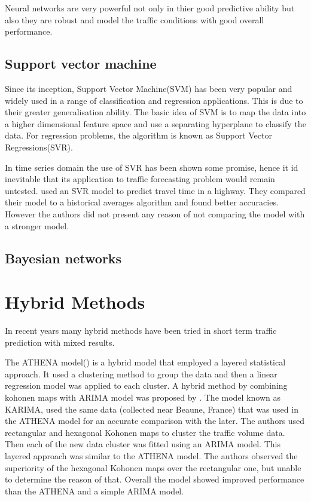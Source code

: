 Neural networks are very powerful not only in thier good predictive ability but also they are robust
and model the traffic conditions with good overall performance.

\subsection{Support vector machine}
Since its inception, Support Vector Machine(SVM) has been very popular and widely used in a range of
classification and regression applications. This is due to their greater generalisation ability.
The basic idea of SVM is to map the data into a higher dimensional feature space and use a separating
hyperplane to classify the data. For regression problems, the algorithm is known as Support Vector
Regressions(SVR).


In time series domain the use of SVR has been shown some promise, hence it id inevitable that its
application to traffic forecasting problem would remain untested. \citet{wu2004travel} used an SVR
model to predict travel time in a highway. They compared their model to a historical averages algorithm
and found better accuracies. However the authors did not present any reason of not comparing the model
with a stronger model.

\subsection{Bayesian networks}

\citet{castillo2008predicting}


\section{Hybrid Methods}
In recent years many hybrid methods have been tried in short term traffic prediction with mixed
results.

The ATHENA model(\citet{danech1991athena}) is a hybrid model that employed a layered statistical
approach. It used a clustering method to group the data and then a linear regression model was applied
to each cluster. A hybrid method by combining kohonen maps with ARIMA model was proposed by
\citet{van1996combining}. The model known as KARIMA, used the same data (collected near Beaune,
France) that was used in the ATHENA model for an accurate comparison with the later. The authors
used rectangular and hexagonal Kohonen maps to cluster the traffic volume data. Then each of the
new data cluster was fitted using an ARIMA model. This layered approach was similar to the ATHENA
model. The authors observed the superiority of the hexagonal Kohonen maps over the rectangular one,
but unable to determine the reason of that. Overall the model showed improved performance than the
ATHENA and a simple ARIMA model.

